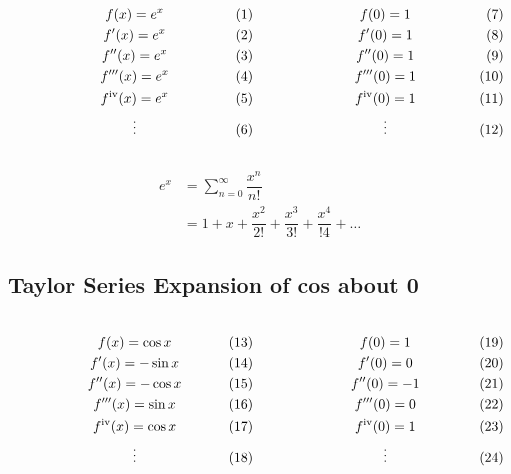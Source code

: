 \documentclass{article}
\begin{document}
$\begin{array}{c c}
	\parbox[c]{0.5\textwidth}{
		\begin{gather*}
			f(x) = e^x\\
			f'(x) = e^x\\
			f''(x) = e^x\\
			f'''(x) = e^x\\
			f^{\text{iv}}(x) = e^x\\
			\vdots
		\end{gather*}}
	&
	\parbox[c]{0.5\textwidth}{
		\begin{gather*}
			f(0) = 1\\
			f'(0) = 1\\
			f''(0) = 1\\
			f'''(0) = 1\\
			f^{\text{iv}}(0) = 1\\
			\vdots
		\end{gather*}}
\end{array}$

\begin{align*}
	e^x &= \sum_{n = 0}^{\infty}\dfrac{x^n}{n!}\\
		&= 1+x+\dfrac{x^2}{2!}+\dfrac{x^3}{3!}+\dfrac{x^4}{!4}+\dots
\end{align*}

\subsection{Taylor Series Expansion of cos about 0}

$\begin{array}{c c}
	\parbox[c]{0.5\textwidth}{
	\begin{gather*}
		f(x) = \cos x\\
		f'(x) = -\sin x\\
		f''(x) = -\cos x\\
		f'''(x) = \sin x\\
		f^{\text{iv}}(x) = \cos x\\
		\vdots
	\end{gather*}}
&
	\parbox[c]{0.5\textwidth}{
	\begin{gather*}
		f(0) = 1\\
		f'(0) = 0\\
		f''(0) = -1\\
		f'''(0) = 0\\
		f^{\text{iv}}(0) = 1\\
		\vdots
	\end{gather*}}
\end{array}$
\end{document}
